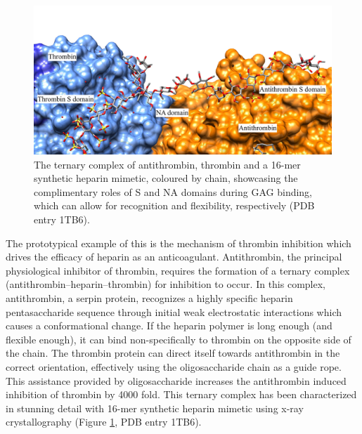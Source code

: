 \documentclass[journal=jctcce,manuscript=article]{achemso}
\begin{document}
{\begin{figure}[tl!]
    \centering
    \includegraphics[width=13cm]{AntiThrombinThrombinHeparinMimetic.jpg}
    \caption{The ternary complex of antithrombin, thrombin and a 16-mer synthetic heparin mimetic, coloured by chain, showcasing the complimentary roles of S and NA domains during GAG binding, which can allow for recognition and flexibility, respectively (PDB entry 1TB6).}
    \label{fig:ternary}
\end{figure}

The prototypical example of this is the mechanism of thrombin inhibition which drives the efficacy of heparin as an anticoagulant. \cite{Li2004StructureHeparin, Dementiev2004TheSpecificity}
Antithrombin, the principal physiological inhibitor of thrombin, requires the formation of a ternary complex (antithrombin--heparin--thrombin) for inhibition to occur.\cite{Capila2002Heparin-proteinInteractions., Nahain2018HeparinActivity} In this complex, antithrombin, a serpin protein, recognizes a highly specific heparin pentasaccharide sequence through initial weak electrostatic interactions which causes a conformational change. If the heparin polymer is long enough (and flexible enough), it can bind non-specifically to thrombin on the opposite side of the chain. The thrombin protein can direct itself towards antithrombin in the correct orientation, effectively using the oligosaccharide chain as a guide rope.\cite{Li2004StructureHeparin, Dementiev2004TheSpecificity} This assistance provided by oligosaccharide increases the antithrombin induced inhibition of thrombin by 4000 fold. \cite{Li2004StructureHeparin, Dementiev2004TheSpecificity} 
This ternary complex has been characterized in stunning detail with 16-mer synthetic heparin mimetic using x-ray crystallography (Figure \ref{fig:ternary}, PDB entry 1TB6).\cite{Dementiev2004TheSpecificity}

}
\end{document}

